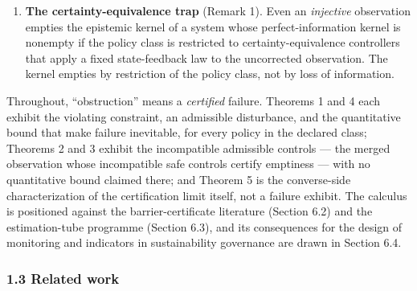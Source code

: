 \documentclass[11pt]{article}
\begin{document}
\begin{enumerate}
  \textbf{The fibre certification criterion} (Theorem 5, Corollary 6).
  An exact observation-only safety certifier --- a function of the
  observation that returns ``safe'' exactly on the safe set --- exists
  if and only if safe-set membership is constant on every observation
  fibre. The certainly-safe set is the sound relaxation: the largest set
  of observations that can be labeled safe without further information.
\item
  \textbf{The certainty-equivalence trap} (Remark 1). Even an
  \emph{injective} observation empties the epistemic kernel of a system
  whose perfect-information kernel is nonempty if the policy class is
  restricted to certainty-equivalence controllers that apply a fixed
  state-feedback law to the uncorrected observation. The kernel empties
  by restriction of the policy class, not by loss of information.
\end{enumerate}

Throughout, ``obstruction'' means a \emph{certified} failure. Theorems 1
and 4 each exhibit the violating constraint, an admissible disturbance,
and the quantitative bound that make failure inevitable, for every
policy in the declared class; Theorems 2 and 3 exhibit the incompatible
admissible controls --- the merged observation whose incompatible safe
controls certify emptiness --- with no quantitative bound claimed there;
and Theorem 5 is the converse-side characterization of the certification
limit itself, not a failure exhibit. The calculus is positioned against
the barrier-certificate literature (Section 6.2) and the estimation-tube
programme (Section 6.3), and its consequences for the design of
monitoring and indicators in sustainability governance are drawn in
Section 6.4.

\subsubsection{1.3 Related work}\label{related-work}
\end{document}
